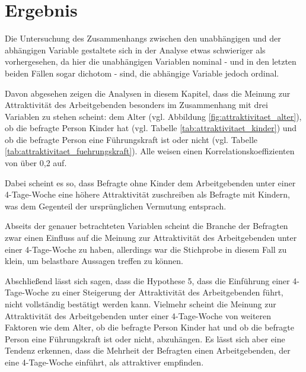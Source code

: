 \section{Ergebnis}

Die Untersuchung des Zusammenhangs zwischen den unabhängigen und der abhängigen Variable gestaltete sich in der Analyse etwas schwieriger als vorhergesehen, 
da hier die unabhängigen Variablen nominal - und in den letzten beiden Fällen sogar dichotom - sind, die abhängige Variable jedoch ordinal.

Davon abgesehen zeigen die Analysen in diesem Kapitel, dass die Meinung zur Attraktivität des Arbeitgebenden besonders im 
Zusammenhang mit drei Variablen zu stehen scheint: dem Alter (vgl. Abbildung \ref{fig:attraktivitaet_alter}), 
ob die befragte Person Kinder hat (vgl. Tabelle \ref{tab:attraktivitaet_kinder}) und ob die befragte Person eine Führungskraft ist 
oder nicht (vgl. Tabelle \ref{tab:attraktivitaet_fuehrungskraft}). Alle weisen einen Korrelationskoeffizienten von über 0,2 auf. 

Dabei scheint es so, dass Befragte ohne Kinder dem Arbeitgebenden unter 
einer 4-Tage-Woche eine höhere Attraktivität zuschreiben als Befragte mit Kindern, was dem Gegenteil der ursprünglichen Vermutung entsprach. 



Abseits der genauer betrachteten Variablen scheint die Branche der Befragten zwar einen Einfluss auf die Meinung zur Attraktivität des Arbeitgebenden unter einer 4-Tage-Woche
zu haben, allerdings war die Stichprobe in diesem Fall zu klein, um belastbare Aussagen treffen zu können.

Abschließend lässt sich sagen, dass die Hypothese 5, dass die Einführung einer 4-Tage-Woche zu einer Steigerung der Attraktivität des Arbeitgebenden führt,
nicht vollständig bestätigt werden kann. Vielmehr scheint die Meinung zur Attraktivität des Arbeitgebenden unter einer 4-Tage-Woche von weiteren Faktoren
wie dem Alter, ob die befragte Person Kinder hat und ob die befragte Person eine Führungskraft ist oder nicht, abzuhängen.
Es lässt sich aber eine Tendenz erkennen, dass die Mehrheit der Befragten einen Arbeitgebenden, der eine 4-Tage-Woche einführt, als attraktiver empfinden.